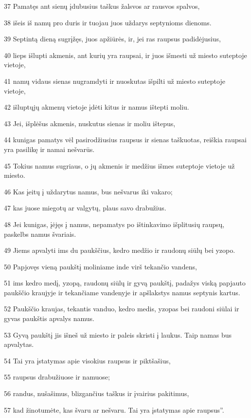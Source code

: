 \par 37 Pamatęs ant sienų įdubusius taškus žalsvos ar rausvos spalvos, 
\par 38 išeis iš namų pro duris ir tuojau juos uždarys septynioms dienoms. 
\par 39 Septintą dieną sugrįžęs, juos apžiūrės, ir, jei ras raupsus padidėjusius, 
\par 40 lieps išlupti akmenis, ant kurių yra raupsai, ir juos išmesti už miesto suteptoje vietoje, 
\par 41 namų vidaus sienas nugramdyti ir nuoskutas išpilti už miesto suteptoje vietoje, 
\par 42 išluptųjų akmenų vietoje įdėti kitus ir namus ištepti moliu. 
\par 43 Jei, išplėšus akmenis, nuskutus sienas ir moliu ištepus, 
\par 44 kunigas pamatys vėl pasirodžiusius raupsus ir sienas taškuotas, reiškia raupsai yra pasilikę ir namai nešvarūs. 
\par 45 Tokius namus sugriaus, o jų akmenis ir medžius išmes suteptoje vietoje už miesto. 
\par 46 Kas įeitų į uždarytus namus, bus nešvarus iki vakaro; 
\par 47 kas juose miegotų ar valgytų, plaus savo drabužius. 
\par 48 Jei kunigas, įėjęs į namus, nepamatys po ištinkavimo išplitusių raupsų, paskelbs namus švariais. 
\par 49 Jiems apvalyti ims du paukščius, kedro medžio ir raudonų siūlų bei yzopo. 
\par 50 Papjovęs vieną paukštį moliniame inde virš tekančio vandens, 
\par 51 ims kedro medį, yzopą, raudonų siūlų ir gyvą paukštį, padažys viską papjauto paukščio kraujyje ir tekančiame vandenyje ir apšlakstys namus septynis kartus. 
\par 52 Paukščio kraujas, tekantis vanduo, kedro medis, yzopas bei raudoni siūlai ir gyvas paukštis apvalys namus. 
\par 53 Gyvą paukštį jis išneš už miesto ir paleis skristi į laukus. Taip namas bus apvalytas. 
\par 54 Tai yra įstatymas apie visokius raupsus ir piktšašius, 
\par 55 raupsus drabužiuose ir namuose; 
\par 56 randus, nušašimus, blizgančius taškus ir įvairius pakitimus, 
\par 57 kad žinotumėte, kas švaru ar nešvaru. Tai yra įstatymas apie raupsus”.




